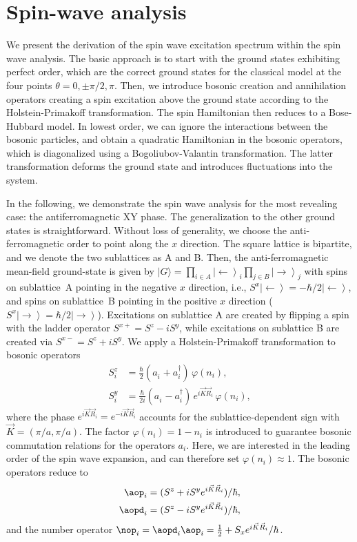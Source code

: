 \chapter{Spin-wave analysis}
\label{spinwave_analysis}

We present the derivation of the spin wave excitation spectrum
within the spin wave analysis. The basic approach is to start with the ground
states exhibiting perfect order, which are the correct ground states for the classical
model at the four points $\theta = 0,\pm \pi/2, \pi$.  Then, we introduce bosonic
creation and annihilation operators creating a spin excitation above the ground
state according to the Holstein-Primakoff transformation. The spin Hamiltonian
then reduces to a Bose-Hubbard model. In lowest order, we can ignore the
interactions between the bosonic particles, and obtain a quadratic Hamiltonian
in the bosonic operators, which is diagonalized using a
Bogoliubov-Valantin transformation.  The latter transformation deforms the
ground state and introduces fluctuations into the system.

In the following, we demonstrate the spin wave analysis for the most revealing case: the antiferromagnetic XY phase.
The generalization to the other ground states is straightforward.  Without loss of generality, we choose the anti-ferromagnetic order
to point along the  $x$ direction. The square lattice is bipartite, and we denote the two sublattices as A and B. Then, the anti-ferromagnetic
 mean-field ground-state is given by   $|G\rangle = \prod_{i\in A} \left|\leftarrow\right\rangle_{i} \prod_{j\in B} \left|\rightarrow\right\rangle_{j}$
 with spins on sublattice~A pointing in the negative $x$ direction, i.e., $S^x \left|\leftarrow\right\rangle = -\hbar/2 \left|\leftarrow\right\rangle$,
 and spins on sublattice~B pointing in the positive $x$ direction ($S^x \left|\rightarrow\right\rangle = \hbar/2 \left|\rightarrow\right\rangle$).
 Excitations on sublattice A are created by flipping a spin with the ladder operator $S^{x+} = S^z-i S^y$,
 while excitations on sublattice B are created via $S^{x-} = S^z+i S^y$.
 We apply a Holstein-Primakoff transformation to bosonic operators
\begin{align}
    S^z_i &= \frac{\hbar}{2} (a^{\phantom\dag}_i + a^{\dag}_i) \,\varphi(n_i),\\
    S^y_i &= \frac{\hbar}{2i} (a^{\phantom\dag}_i - a^{\dag}_i)\, e^{i {\vec K} {\vec R_i}} \,\varphi(n_i),
\end{align}
where the phase $e^{i {\vec K}{\vec R_i}}=e^{-i {\vec K}{\vec R_i}}$ accounts for the sublattice-dependent sign with ${\vec K} = (\pi/a, \pi/a)$. The factor $\varphi(n_i)=1-n_i$ is introduced to guarantee bosonic commutation relations for the operators $a_i$.  Here, we are interested in the leading order of the spin wave expansion, and can therefore set
 $\varphi(n_i) \approx 1$. The bosonic operators reduce to
%
\begin{align}
    \aop_i &= (S^z +i S^y e^{i {\vec K} {\vec R_i}} )/\hbar,\\
    \aopd_i &= (S^z -i S^y e^{i {\vec K} {\vec R_i}})/\hbar,
\end{align}
%
and the number operator $\nop_i = \aopd_i \aop_i = \frac{1}{2} + S_x e^{i {\vec K}{\vec R_i}}/\hbar$.


